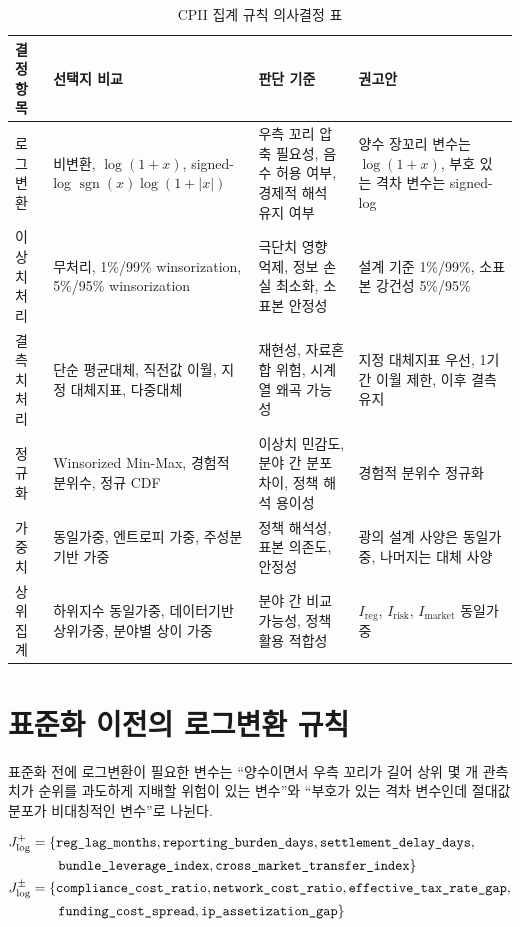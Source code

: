 \documentclass[11pt,a4paper]{report}
\begin{document}
\begin{table}[H]
  \centering
  \footnotesize
  \caption{CPII 집계 규칙 의사결정 표}\label{tab:cpii_aggregation_decision}
  \begin{tabular}{L{2.4cm}L{4.0cm}L{4.0cm}L{2.4cm}}
    \toprule
    결정 항목 & 선택지 비교 & 판단 기준 & 권고안 \\
    \midrule
    로그변환 & 비변환, $\log(1+x)$, signed-log $\operatorname{sgn}(x)\log(1+|x|)$ & 우측 꼬리 압축 필요성, 음수 허용 여부, 경제적 해석 유지 여부 & 양수 장꼬리 변수는 $\log(1+x)$, 부호 있는 격차 변수는 signed-log \\
    이상치 처리 & 무처리, 1\%/99\% winsorization, 5\%/95\% winsorization & 극단치 영향 억제, 정보 손실 최소화, 소표본 안정성 & 설계 기준 1\%/99\%, 소표본 강건성 5\%/95\% \\
    결측치 처리 & 단순 평균대체, 직전값 이월, 지정 대체지표, 다중대체 & 재현성, 자료혼합 위험, 시계열 왜곡 가능성 & 지정 대체지표 우선, 1기간 이월 제한, 이후 결측 유지 \\
    정규화 & Winsorized Min-Max, 경험적 분위수, 정규 CDF & 이상치 민감도, 분야 간 분포 차이, 정책 해석 용이성 & 경험적 분위수 정규화 \\
    가중치 & 동일가중, 엔트로피 가중, 주성분 기반 가중 & 정책 해석성, 표본 의존도, 안정성 & 광의 설계 사양은 동일가중, 나머지는 대체 사양 \\
    상위 집계 & 하위지수 동일가중, 데이터기반 상위가중, 분야별 상이 가중 & 분야 간 비교 가능성, 정책 활용 적합성 & $I_{\mathrm{reg}}$, $I_{\mathrm{risk}}$, $I_{\mathrm{market}}$ 동일가중 \\
    \bottomrule
  \end{tabular}
\end{table}

\section{표준화 이전의 로그변환 규칙}
표준화 전에 로그변환이 필요한 변수는 ``양수이면서 우측 꼬리가 길어 상위 몇 개 관측치가 순위를 과도하게 지배할 위험이 있는 변수''와 ``부호가 있는 격차 변수인데 절대값 분포가 비대칭적인 변수''로 나뉜다.

\begin{align}
J_{\log}^{+} &= \{\texttt{reg\_lag\_months}, \texttt{reporting\_burden\_days}, \texttt{settlement\_delay\_days}, \notag \\
&\qquad \texttt{bundle\_leverage\_index}, \texttt{cross\_market\_transfer\_index}\} \\
J_{\log}^{\pm} &= \{\texttt{compliance\_cost\_ratio}, \texttt{network\_cost\_ratio}, \texttt{effective\_tax\_rate\_gap}, \notag \\
&\qquad \texttt{funding\_cost\_spread}, \texttt{ip\_assetization\_gap}\} \label{eq:cpii_log_sets}
\end{align}
\end{document}
